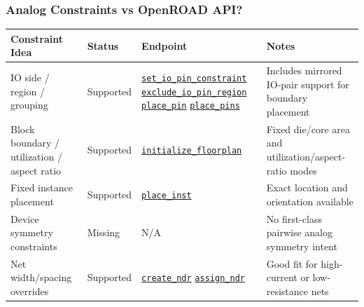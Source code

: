 \begin{frame}
  \frametitle{Analog Constraints vs OpenROAD API?}
  \tiny
  \begin{center}
    \begin{tabular}{p{2.6cm}|p{1.2cm}|p{3.9cm}|p{4.0cm}}
      \hline
      \textbf{Constraint Idea} & \textbf{Status} & \textbf{Endpoint} & \textbf{Notes} \\
      \hline
      IO side / region / grouping &
      Supported &
      \href{https://openroad.readthedocs.io/en/latest/main/src/ppl/README.html\#set-io-pin-constraints}{\texttt{set\_io\_pin\_constraint}} \newline
      \href{https://openroad.readthedocs.io/en/latest/main/src/ppl/README.html\#exclude-io-pin-region}{\texttt{exclude\_io\_pin\_region}} \newline
      \href{https://openroad.readthedocs.io/en/latest/main/src/ppl/README.html\#place-specific-pin}{\texttt{place\_pin}} \newline
      \href{https://openroad.readthedocs.io/en/latest/main/src/ppl/README.html\#place-all-pins}{\texttt{place\_pins}} &
      Includes mirrored IO-pair support for boundary placement \\
      \hline
      Block boundary / utilization / aspect ratio &
      Supported &
      \href{https://openroad.readthedocs.io/en/latest/main/src/ifp/README.html\#initialize-floorplan}{\texttt{initialize\_floorplan}} &
      Fixed die/core area and utilization/aspect-ratio modes \\
      \hline
      Fixed instance placement &
      Supported &
      \href{https://openroad.readthedocs.io/en/latest/main/src/README.html\#tcl-functions}{\texttt{place\_inst}} &
      Exact location and orientation available \\
      \hline
      Device symmetry constraints &
      Missing &
      N/A &
      No first-class pairwise analog symmetry intent \\
      \hline
      Net width/spacing overrides &
      Supported &
      \href{https://openroad.readthedocs.io/en/latest/main/src/odb/README.html\#create-ndr}{\texttt{create\_ndr}} \newline
      \href{https://openroad.readthedocs.io/en/latest/main/src/README.html\#tcl-functions}{\texttt{assign\_ndr}} &
      Good fit for high-current or low-resistance nets \\

\end{tabular}
\end{center}
\end{frame}
